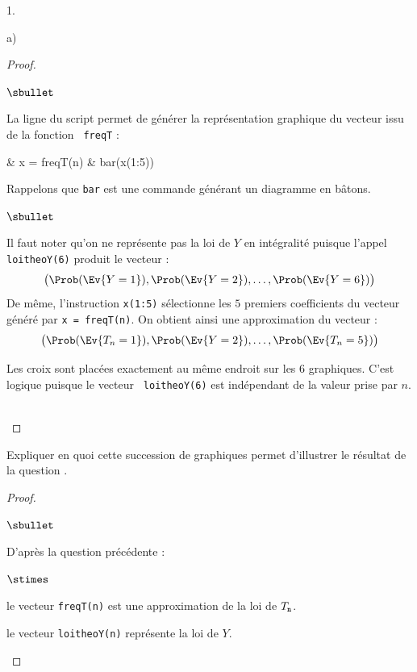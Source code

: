 \documentclass[11pt]{article}%
\begin{document}
\begin{noliste}{1.}
\begin{noliste}{a)}
\begin{proof}
\begin{noliste}{$\sbullet$}
      \item La ligne  du script permet de générer la
        représentation graphique du vecteur issu de la fonction {\tt
          freqT} :
        \begin{scilabC}{10}
          & x = freqT(n) \nl %
          & bar(x(1:5)) \nl %
        \end{scilabC}
        Rappelons que {\tt bar} est une commande générant un diagramme
        en bâtons.%
      \end{noliste}
      \begin{remark}%
        \begin{noliste}{$\sbullet$}
        \item Il faut noter qu'on ne représente pas la loi de $Y$ en
          intégralité puisque l'appel {\tt loitheoY(6)} produit le
          vecteur : 
          \[
          \big( \Prob(\Ev{Y=1}), \Prob(\Ev{Y=2}), \ldots, \Prob(\Ev{Y=
            6}) \big)
          \]
          De même, l'instruction {\tt x(1:5)} sélectionne les $5$
          premiers coefficients du vecteur généré par {\tt x =
            freqT(n)}. On obtient ainsi une approximation du vecteur :
          \[
          \big( \Prob(\Ev{T_n = 1}), \Prob(\Ev{Y=2}), \ldots,
          \Prob(\Ev{T_n= 5}) \big)
          \]
          {\tt }
        \item Les croix sont placées exactement au même endroit sur
          les $6$ graphiques. C'est logique puisque le vecteur {\tt
            loitheoY(6)} est indépendant de la valeur prise par $n$.
        \end{noliste}
      \end{remark}~\\[-1.4cm]
    \end{proof}
    
    
    \newpage


  \item Expliquer en quoi cette succession de graphiques permet
    d'illustrer le résultat de la question .
  
    \begin{proof}~
      \begin{noliste}{$\sbullet$}
      \item D'après la question précédente :
        \begin{noliste}{$\stimes$}
        \item le vecteur {\tt freqT(n)} est une approximation de la
          loi de $T_{\tt n}$.
        \item le vecteur {\tt loitheoY(n)} représente la loi de $Y$.
        \end{noliste}


\end{noliste}
\end{proof}
\end{noliste}
\end{noliste}
\end{document}
